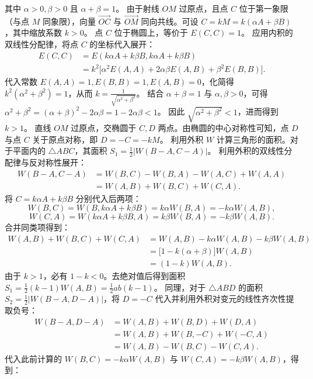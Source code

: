 \begin{solution}
其中 $\alpha > 0, \beta > 0$ 且 $\alpha + \beta = 1$。
由于射线 $OM$ 过原点，且点 $C$ 位于第一象限（与点 $M$ 同象限），向量 $\overrightarrow{OC}$ 与 $\overrightarrow{OM}$ 同向共线。可设 $C = k M = k(\alpha A + \beta B)$，其中缩放系数 $k > 0$。
点 $C$ 位于椭圆上，等价于 $E(C, C) = 1$。
应用内积的双线性分配律，将点 $C$ 的坐标代入展开：
\begin{align*}
E(C, C) &= E(k\alpha A + k\beta B, k\alpha A + k\beta B) \\
&= k^2 \big[ \alpha^2 E(A, A) + 2\alpha\beta E(A, B) + \beta^2 E(B, B) \big].
\end{align*}
代入常数 $E(A,A)=1, E(B,B)=1, E(A,B)=0$，化简得 $k^2(\alpha^2 + \beta^2) = 1$，从而 $k = \frac{1}{\sqrt{\alpha^2 + \beta^2}}$。
结合 $\alpha + \beta = 1$ 与 $\alpha, \beta > 0$，可得 $\alpha^2 + \beta^2 = (\alpha + \beta)^2 - 2\alpha\beta = 1 - 2\alpha\beta < 1$。
因此 $\sqrt{\alpha^2 + \beta^2} < 1$，进而得到 $k > 1$。
直线 $OM$ 过原点，交椭圆于 $C, D$ 两点。由椭圆的中心对称性可知，点 $D$ 与点 $C$ 关于原点对称，即 $D = -C = -kM$。
利用外积 $W$ 计算三角形的面积。对于平面内的 $\triangle ABC$，其面积 $S_1 = \frac{1}{2} |W(B-A, C-A)|$。
利用外积的双线性分配律与反对称性展开：
\begin{align*}
W(B-A, C-A) &= W(B, C) - W(B, A) - W(A, C) + W(A, A) \\
&= W(A, B) + W(B, C) + W(C, A).
\end{align*}
将 $C = k\alpha A + k\beta B$ 分别代入后两项：
\[ W(B, C) = W(B, k\alpha A + k\beta B) = k\alpha W(B, A) = -k\alpha W(A, B), \]
\[ W(C, A) = W(k\alpha A + k\beta B, A) = k\beta W(B, A) = -k\beta W(A, B). \]
合并同类项得到：
\begin{align*}
W(A, B) + W(B, C) + W(C, A) &= W(A, B) - k\alpha W(A, B) - k\beta W(A, B) \\
&= \big[1 - k(\alpha + \beta)\big] W(A, B) \\
&= (1 - k) W(A, B).
\end{align*}
由于 $k > 1$，必有 $1 - k < 0$。去绝对值后得到面积 $S_1 = \frac{1}{2} (k - 1) W(A, B) = \frac{1}{2} ab(k - 1)$。
同理，对于 $\triangle ABD$ 的面积 $S_2 = \frac{1}{2} |W(B-A, D-A)|$，将 $D = -C$ 代入并利用外积对变元的线性齐次性提取负号：
\begin{align*}
W(B-A, D-A) &= W(A, B) + W(B, D) + W(D, A) \\
&= W(A, B) + W(B, -C) + W(-C, A) \\
&= W(A, B) - W(B, C) - W(C, A).
\end{align*}
代入此前计算的 $W(B, C) = -k\alpha W(A, B)$ 与 $W(C, A) = -k\beta W(A, B)$，得到：

\end{solution}
